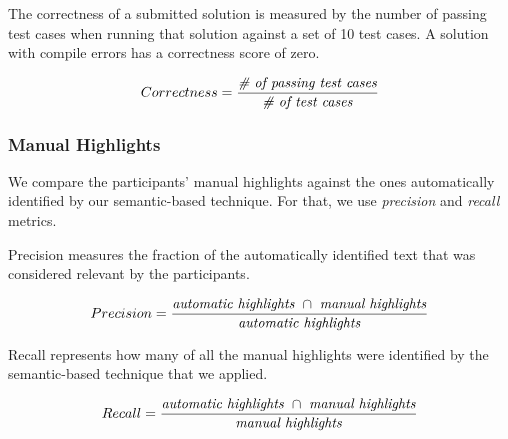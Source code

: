 { 
The correctness of a submitted solution is measured by the number of passing test cases
when running that solution against a set of 10 test cases. 
A solution with compile errors has a correctness score of zero.


\smallskip
\begin{small}


\begin{equation}
    Correctness = \frac{ \text{\textit{\# of passing test cases}}}{\text{\textit{\#  of test cases}}}
\end{equation}
\end{small}



\subsubsection{Manual Highlights}


We compare the participants' manual highlights  against the ones automatically identified by our semantic-based technique. 
For that, we use \textit{precision} and \textit{recall} metrics. 




Precision measures the fraction of the automatically identified text that was  considered relevant
by the participants.

\smallskip
\begin{small}


\begin{equation}
    Precision = \frac{
        \text{\textit{automatic highlights}~} \cap 
        \text{~\textit{manual highlights}}
    }{\text{\textit{automatic highlights}}}
\end{equation}
\end{small}


Recall represents how many of all the manual highlights were identified by the semantic-based technique that we applied.

\smallskip
\begin{small}

\begin{equation}
    Recall = \frac{
        \text{\textit{automatic highlights}~} \cap 
        \text{~\textit{manual highlights}}
    }{\text{\textit{manual highlights}}}
\end{equation}
\end{small}

\medskip
{}


}
